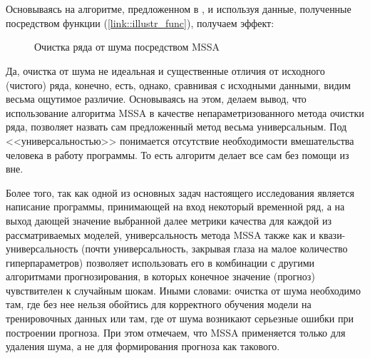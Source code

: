 \\\\
Основываясь на алгоритме, предложенном в \cite{kuang2020efficient}, и используя данные, полученные посредством функции (\ref{link::illustr_func}), получаем эффект:
\begin{figure}[H]
	\centering
	\caption{Очистка ряда от шума посредством MSSA}
\end{figure}
\noindent Да, очистка от шума не идеальная и существенные отличия от исходного (чистого) ряда, конечно, есть, однако, сравнивая с исходными данными, видим весьма ощутимое различие. Основываясь на этом, делаем вывод, что использование алгоритма MSSA в качестве непараметризованного метода очистки ряда, позволяет назвать сам предложенный метод весьма универсальным. Под <<универсальностью>> понимается отсутствие необходимости вмешательства человека в работу программы. То есть алгоритм делает все сам без помощи из вне. 

Более того, так как одной из основных задач настоящего исследования является написание программы, принимающей на вход некоторый временной ряд, а на выход дающей значение выбранной далее метрики качества для каждой из рассматриваемых моделей, универсальность метода MSSA также как и квази-универсальность (почти универсальность, закрывая глаза на малое количество гиперпараметров) позволяет использовать его в комбинации с другими алгоритмами прогнозирования, в которых конечное значение (прогноз) чувствителен к случайным шокам. Иными словами: очистка от шума необходимо там, где без нее нельзя обойтись для корректного обучения модели на тренировочных данных или там, где от шума возникают серьезные ошибки при построении прогноза. При этом отмечаем, что MSSA применяется только для удаления шума, а не для формирования прогноза как такового.